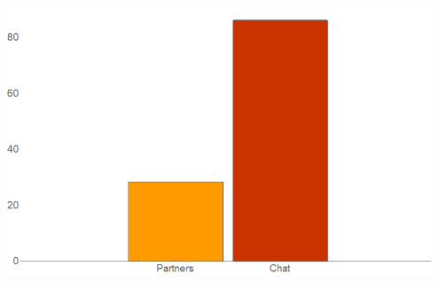 \documentclass{beamer}
\begin{document}


\begin{frame}
\begin{card}
    \begin{center}
    \includegraphics[width=0.95\textwidth]{./i/EffChat.png}
    \end{center}
\end{card}
\end{frame}

    
\end{document}
